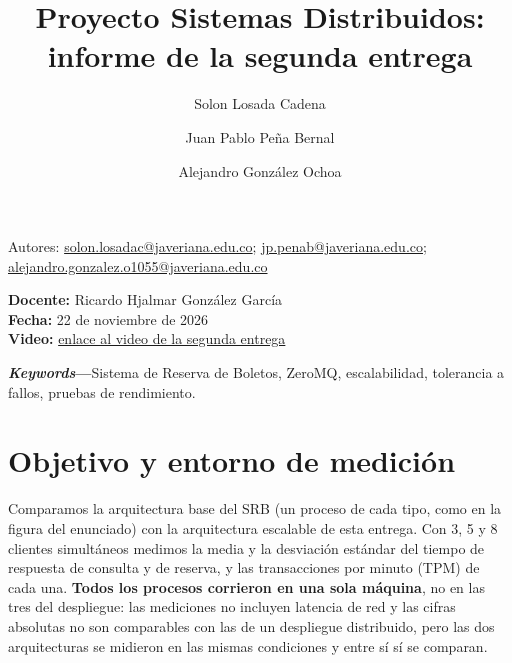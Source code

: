 \documentclass[10pt, a4paper]{article}
\title{\Large \textbf{Proyecto Sistemas Distribuidos: informe de la segunda entrega}}
\author[1]{Solon Losada Cadena}
\author[1]{Juan Pablo Peña Bernal}
\author[1]{Alejandro González Ochoa}
\affil[1]{Departamento de Ingeniería de Sistemas, Pontificia Universidad Javeriana, Bogotá, 110231, Colombia.}
\date{}
\begin{document}
	\maketitle
	\vspace{-1.2cm}

	\begin{center}
		\small Autores: \href{mailto:solon.losadac@javeriana.edu.co}{\color{blue}solon.losadac@javeriana.edu.co}; \href{mailto:jp.penab@javeriana.edu.co}{\color{blue}jp.penab@javeriana.edu.co}; \href{mailto:alejandro.gonzalez.o1055@javeriana.edu.co}{\color{blue}alejandro.gonzalez.o1055@javeriana.edu.co}
	\end{center}

	\begin{center}
		\textbf{Docente:} Ricardo Hjalmar González García \\
		\textbf{Fecha:} 22 de noviembre de 2026 \\
		\textbf{Video:} \href{https://drive.google.com/drive/folders/1UDNqkXTleU3nn4BU5am9ttJe5K5cbXOO?usp=sharing}{\color{blue}enlace al video de la segunda entrega}
	\end{center}

	\vspace{0.4cm}


	{\small \textbf{\textit{Keywords}---}Sistema de Reserva de Boletos, ZeroMQ, escalabilidad, tolerancia a fallos, pruebas de rendimiento.\par}

	\section{Objetivo y entorno de medición}
	\label{sec:entorno}

	Comparamos la arquitectura base del SRB (un proceso de cada tipo, como en la figura del enunciado) con la arquitectura escalable de esta entrega. Con 3, 5 y 8 clientes simultáneos medimos la media y la desviación estándar del tiempo de respuesta de consulta y de reserva, y las transacciones por minuto (TPM) de cada una. \textbf{Todos los procesos corrieron en una sola máquina}, no en las tres del despliegue: las mediciones no incluyen latencia de red y las cifras absolutas no son comparables con las de un despliegue distribuido, pero las dos arquitecturas se midieron en las mismas condiciones y entre sí sí se comparan.
\end{document}
